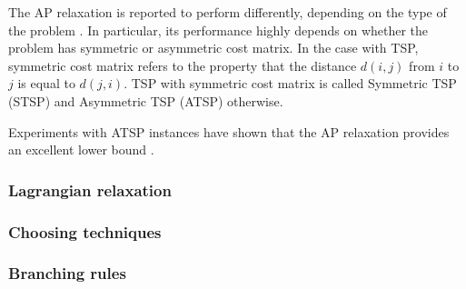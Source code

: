 \documentclass{mprop}
\theoremstyle{definition}
\begin{document}


The AP relaxation is reported to perform differently, depending on the type of the problem \citep{tspbible,Bellmore71}. In particular, its performance highly depends on whether the problem has symmetric or asymmetric cost matrix. In the case with TSP, symmetric cost matrix refers to the property that the distance $d(i,j)$ from $i$ to $j$ is equal to $d(j,i)$. TSP with symmetric cost matrix is called Symmetric TSP (STSP) and Asymmetric TSP (ATSP) otherwise.

Experiments with ATSP instances have shown that the AP relaxation provides an excellent lower bound \citep{tspbible}. 

\subsubsection{Lagrangian relaxation}

\subsubsection{Choosing techniques}

\subsubsection{Branching rules}

\end{document}
